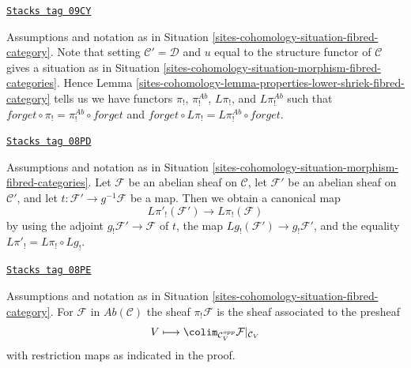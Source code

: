 \begin{remark}
\label{sites-cohomology-remark-fibred-category}
\href{https://stacks.math.columbia.edu/tag/09CY}{\texttt{Stacks tag 09CY}}

Assumptions and notation as in Situation \ref{sites-cohomology-situation-fibred-category}.
Note that setting $\mathcal{C}' = \mathcal{D}$ and $u$ equal to the
structure functor of $\mathcal{C}$ gives a situation as in
Situation \ref{sites-cohomology-situation-morphism-fibred-categories}. Hence
Lemma \ref{sites-cohomology-lemma-properties-lower-shriek-fibred-category}
tells us we have functors  $\pi_!$, $\pi_!^{\textit{Ab}}$, $L\pi_!$, and
$L\pi_!^{\textit{Ab}}$ such that
$forget \circ \pi_! = \pi_!^{\textit{Ab}} \circ forget$ and
$forget \circ L\pi_! = L\pi_!^{\textit{Ab}} \circ forget$.
\end{remark}

\begin{remark}
\label{sites-cohomology-remark-morphism-fibred-categories}
\href{https://stacks.math.columbia.edu/tag/08PD}{\texttt{Stacks tag 08PD}}

Assumptions and notation as in
Situation \ref{sites-cohomology-situation-morphism-fibred-categories}.
Let $\mathcal{F}$ be an abelian sheaf on $\mathcal{C}$,
let $\mathcal{F}'$ be an abelian sheaf on $\mathcal{C}'$,
and let $t : \mathcal{F}' \to g^{-1}\mathcal{F}$ be a map.
Then we obtain a canonical map
$$
L\pi'_!(\mathcal{F}') \longrightarrow L\pi_!(\mathcal{F})
$$
by using the adjoint $g_!\mathcal{F}' \to \mathcal{F}$ of $t$,
the map $Lg_!(\mathcal{F}') \to g_!\mathcal{F}'$, and the
equality $L\pi'_! = L\pi_! \circ Lg_!$.
\end{remark}

\begin{lemma}
\label{sites-cohomology-lemma-compute-pi-shriek}
\href{https://stacks.math.columbia.edu/tag/08PE}{\texttt{Stacks tag 08PE}}

Assumptions and notation as in
Situation \ref{sites-cohomology-situation-fibred-category}.
For $\mathcal{F}$ in $\textit{Ab}(\mathcal{C})$
the sheaf $\pi_!\mathcal{F}$ is the
sheaf associated to the presheaf
$$
V \longmapsto \colim_{\mathcal{C}_V^{opp}} \mathcal{F}|_{\mathcal{C}_V}
$$
with restriction maps as indicated in the proof.
\end{lemma}

